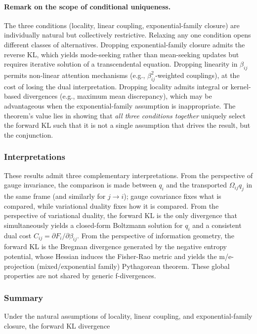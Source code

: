 \documentclass[twoside,11pt]{article}
\begin{document}
\paragraph{Remark on the scope of conditional uniqueness.}
The three conditions (locality, linear coupling, exponential-family closure) are individually natural but collectively restrictive. Relaxing any one condition opens different classes of alternatives. Dropping exponential-family closure admits the reverse KL, which yields mode-seeking rather than mean-seeking updates but requires iterative solution of a transcendental equation. Dropping linearity in $\beta_{ij}$ permits non-linear attention mechanisms (e.g., $\beta_{ij}^2$-weighted couplings), at the cost of losing the dual interpretation. Dropping locality admits integral or kernel-based divergences (e.g., maximum mean discrepancy), which may be advantageous when the exponential-family assumption is inappropriate.
The theorem's value lies in showing that \emph{all three conditions together} uniquely select the forward KL such that it is not a single assumption that drives the result, but the conjunction.

\subsubsection{Interpretations}
These results admit three complementary interpretations. From the perspective of gauge invariance, the comparison is made between $q_i$ and the transported $\Omega_{ij}q_j$ in the same frame (and similarly for $j \rightarrow i$); gauge covariance fixes what is compared, while variational duality fixes how it is compared. From the perspective of variational duality, the forward KL is the only divergence that simultaneously yields a closed-form Boltzmann solution for $q_i$ and a consistent dual cost $C_{ij} = \partial F_i / \partial \beta_{ij}$. From the perspective of information geometry, the forward KL is the Bregman divergence generated by the negative entropy potential, whose Hessian induces the Fisher-Rao metric and yields the m/e-projection (mixed/exponential family) Pythagorean theorem. These global properties are not shared by generic f-divergences.

\subsubsection{Summary}
Under the natural assumptions of locality, linear coupling, and exponential-family closure, the forward KL divergence
\end{document}
